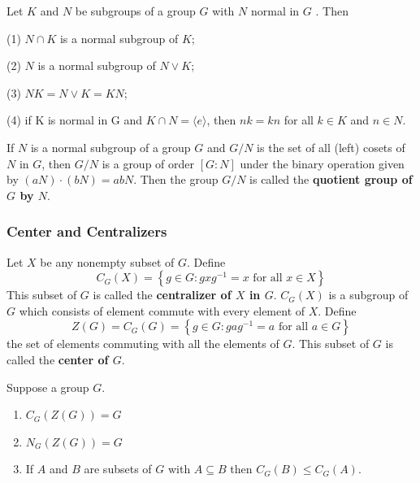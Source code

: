 \begin{theorem}
    Let $K$ and $N$ be subgroups of a group $G$ with $N$ normal in $G$ . Then

    (1) ${N} \cap {K}$ is a normal subgroup of $K$;

    (2) $N$ is a normal subgroup of ${N} \vee {K}$;

    (3) ${NK}={N} \vee {K}={KN}$;

    (4) if K is normal in G and ${K} \cap {N}=\langle{e}\rangle$, then ${nk}={kn}$ for all ${k} \in {K}$ and ${n} \in {N}$.
\end{theorem}


\begin{definition}
    If $N$ is a normal subgroup of a group $G$ and $G / {N}$ is the set of all (left) cosets of $N$ in $G$, then $G / {N}$ is a group of order $[G: {N}]$ under the binary operation given by $\left(aN\right)\cdot (bN)={abN}$.
    Then the group $G / N$ is called the \textbf{quotient group of $G$ by $N$}.
\end{definition}

\subsubsection{Center and Centralizers}
\begin{definition}
    Let $X$ be any nonempty subset
    of $G$.
    Define
    \begin{equation*}
        C_G(X)
        =
        \left\{ g \in G : g x g^{-1}=x
        \text{ for all } x \in X\right\}
    \end{equation*}
    This subset of $G$ is called the \textbf{centralizer of $X$ in $G$}.
    $C_G(X)$ is a subgroup of $G$ which consists of element commute with every element of $X$.
    Define
    \begin{equation*}
        Z(G)
        =
        C_G(G)
        =
        \left\{ g \in G : g a g^{-1}=a
        \text{ for all } a \in G\right\}
    \end{equation*}
    the set of elements commuting with all the elements of $G$. This subset of $G$ is called the \textbf{center of $G$}.
\end{definition}



\begin{proposition}
    Suppose a group $G$.
    \begin{enumerate}
        \item
              $C_G(Z(G))=G$

        \item

              $N_G(Z(G))=G$

        \item
              If $A$ and $B$ are subsets of $G$ with $A \subseteq B$ then $C_G(B) \leq C_G(A)$.
    \end{enumerate}
\end{proposition}





